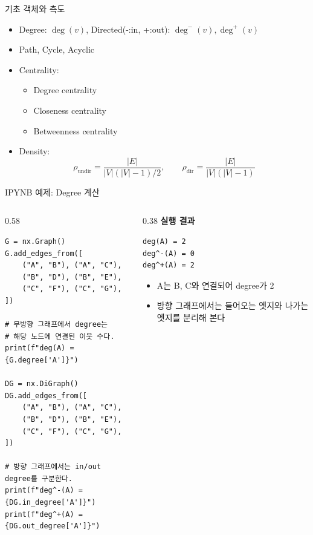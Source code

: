 \begin{frame}{기초 객체와 측도}
\begin{itemize}
  \item Degree: $\deg(v)$, Directed(-:in, +:out): $\deg^-(v),\deg^+(v)$
  \item Path, Cycle, Acyclic
  \item Centrality:
  \begin{itemize}
    \item Degree centrality
    \item Closeness centrality
    \item Betweenness centrality
  \end{itemize}
  \item Density:
\[
\rho_{\text{undir}}=\frac{|E|}{|V|(|V|-1)/2},\qquad
\rho_{\text{dir}}=\frac{|E|}{|V|(|V|-1)}
\]
\end{itemize}
\end{frame}

\begin{frame}[fragile]{IPYNB 예제: Degree 계산}
\begin{columns}[T,onlytextwidth]
\begin{column}{0.58\textwidth}
\begin{lstlisting}
G = nx.Graph()
G.add_edges_from([
    ("A", "B"), ("A", "C"),
    ("B", "D"), ("B", "E"),
    ("C", "F"), ("C", "G"),
])

# 무방향 그래프에서 degree는
# 해당 노드에 연결된 이웃 수다.
print(f"deg(A) = {G.degree['A']}")

DG = nx.DiGraph()
DG.add_edges_from([
    ("A", "B"), ("A", "C"),
    ("B", "D"), ("B", "E"),
    ("C", "F"), ("C", "G"),
])

# 방향 그래프에서는 in/out degree를 구분한다.
print(f"deg^-(A) = {DG.in_degree['A']}")
print(f"deg^+(A) = {DG.out_degree['A']}")
\end{lstlisting}
\end{column}
\begin{column}{0.38\textwidth}
\small
\textbf{실행 결과}
\begin{verbatim}
deg(A) = 2
deg^-(A) = 0
deg^+(A) = 2
\end{verbatim}
\vspace{0.4em}
\begin{itemize}
  \item A는 B, C와 연결되어 degree가 2
  \item 방향 그래프에서는 들어오는 엣지와 나가는 엣지를 분리해 본다
\end{itemize}
\end{column}
\end{columns}
\end{frame}

